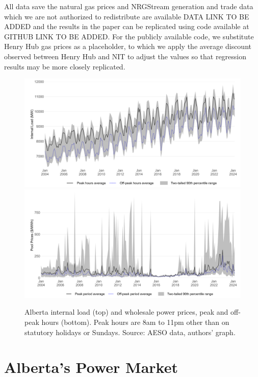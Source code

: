 \documentclass[12pt]{article}
\begin{document}
All data save the natural gas prices and NRGStream generation and trade data which we are not authorized to redistribute are available DATA LINK TO BE ADDED and the results in the paper can be replicated using code available at GITHUB LINK TO BE ADDED. For the publicly available code, we substitute Henry Hub gas prices as a placeholder, to which we apply the average discount observed between Henry Hub and NIT to adjust the values so that regression results may be more closely replicated.
\begin{figure}[h]%
	\centering \vspace{-.25cm} \includegraphics[width=6.5in]{../images/loads_clean.png}
	\centering \vspace{-.25cm} \includegraphics[width=6.5in]{../images/peak_prices.png}
\vspace{-0.75cm}	\caption{Alberta internal load (top) and wholesale power prices, peak and off-peak hours (bottom). Peak hours are 8am to 11pm other than on statutory holidays or Sundays. Source: AESO data, authors' graph.}
\label{fig:ab_prices_and_loads}
\end{figure}

\section{Alberta's Power Market}\label{sec:market}
\end{document}

